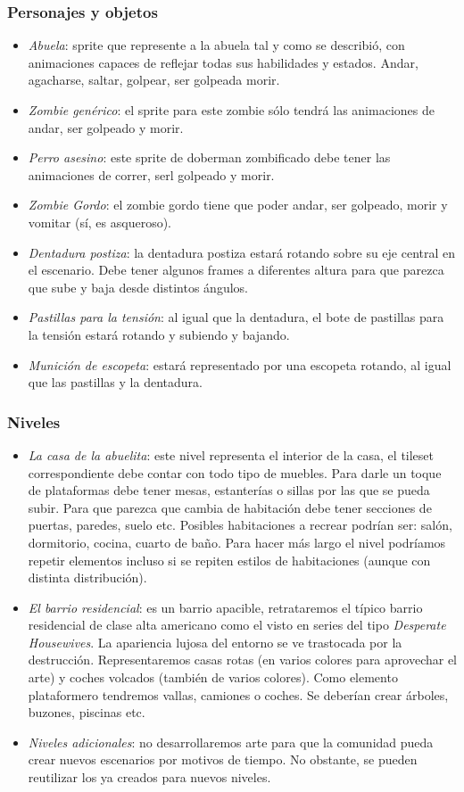 \documentclass[titlepage]{article}
\begin{document}
\subsubsection{Personajes y objetos}
\begin{itemize}
	\item \emph{Abuela}: sprite que represente a la abuela tal y como se describió, con animaciones capaces de reflejar todas sus habilidades y estados. Andar, agacharse, saltar, golpear, ser golpeada morir.
	\item \emph{Zombie genérico}: el sprite para este zombie sólo tendrá las animaciones de andar, ser golpeado y morir.
	\item \emph{Perro asesino}: este sprite de doberman zombificado debe tener las animaciones de correr, serl golpeado y morir.
	\item \emph{Zombie Gordo}: el zombie gordo tiene que poder andar, ser golpeado, morir y vomitar (sí, es asqueroso).
	\item \emph{Dentadura postiza}: la dentadura postiza estará rotando sobre su eje central en el escenario. Debe tener algunos frames a diferentes altura para que parezca que sube y baja desde distintos ángulos.
	\item \emph{Pastillas para la tensión}: al igual que la dentadura, el bote de pastillas para la tensión estará rotando y subiendo y bajando.
	\item \emph{Munición de escopeta}: estará representado por una escopeta rotando, al igual que las pastillas y la dentadura.
\end{itemize}

\subsubsection{Niveles}
\begin{itemize}
	\item \emph{La casa de la abuelita}: este nivel representa el interior de la casa, el tileset correspondiente debe contar con todo tipo de muebles. Para darle un toque de plataformas debe tener mesas, estanterías o sillas por las que se pueda subir. Para que parezca que cambia de habitación debe tener secciones de puertas, paredes, suelo etc. Posibles habitaciones a recrear podrían ser: salón, dormitorio, cocina, cuarto de baño. Para hacer más largo el nivel podríamos repetir elementos incluso si se repiten estilos de habitaciones (aunque con distinta distribución).
	\item \emph{El barrio residencial}: es un barrio apacible, retrataremos el típico barrio residencial de clase alta americano como el visto en series del tipo \emph{Desperate Housewives}. La apariencia lujosa del entorno se ve trastocada por la destrucción. Representaremos casas rotas (en varios colores para aprovechar el arte) y coches volcados (también de varios colores). Como elemento plataformero tendremos vallas, camiones o coches. Se deberían crear árboles, buzones, piscinas etc.
	\item \emph{Niveles adicionales}: no desarrollaremos arte para que la comunidad pueda crear nuevos escenarios por motivos de tiempo. No obstante, se pueden reutilizar los ya creados para nuevos niveles.
\end{itemize}
\end{document}
